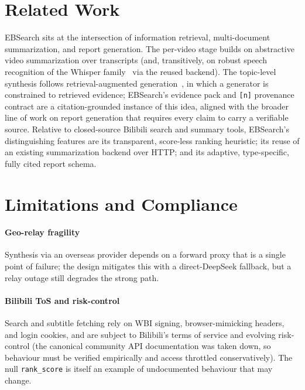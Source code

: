 \documentclass[conference]{IEEEtran}
\begin{document}
\section{Related Work}
\label{sec:related}

EBSearch sits at the intersection of information retrieval, multi-document
summarization, and report generation. The per-video stage builds on abstractive
video summarization over transcripts (and, transitively, on robust speech
recognition of the Whisper family~\cite{whisper} via the reused backend). The
topic-level synthesis follows retrieval-augmented generation~\cite{rag}, in which
a generator is constrained to retrieved evidence; EBSearch's evidence pack and
\texttt{[n]} provenance contract are a citation-grounded instance of this idea,
aligned with the broader line of work on report generation that requires every
claim to carry a verifiable source. Relative to closed-source Bilibili search and
summary tools, EBSearch's distinguishing features are its transparent,
score-less ranking heuristic; its reuse of an existing summarization backend over
HTTP; and its adaptive, type-specific, fully cited report schema.

\section{Limitations and Compliance}
\label{sec:limits}

\paragraph{Geo-relay fragility} Synthesis via an overseas provider depends on a
forward proxy that is a single point of failure; the design mitigates this with a
direct-DeepSeek fallback, but a relay outage still degrades the strong path.

\paragraph{Bilibili ToS and risk-control} Search and subtitle fetching rely on
WBI signing, browser-mimicking headers, and login cookies, and are subject to
Bilibili's terms of service and evolving risk-control (the canonical community
API documentation was taken down, so behaviour must be verified empirically and
access throttled conservatively). The null \texttt{rank\_score} is itself an
example of undocumented behaviour that may change.
\end{document}

